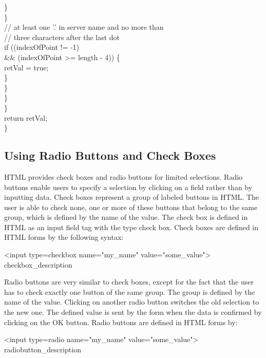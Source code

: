 \begin{java}
\jtabf                                        \}\\
\jtabe                                \}\\
\jtabf 					// at least one '.' in server name and no more than\\
\jtabf 					// three characters after the last dot\\
\jtabe                                if ((indexOfPoint != -1)\\
\jtabe				      \&\& (indexOfPoint >= length - 4)) \{\\
\jtabf                                        retVal = true;\\
\jtabe                                \}\\
\jtabd                        \}\\
\jtabc                \}\\
\jtabb        \}\\
return retVal;\\
\}\\
\end{java}

\subsection{Using Radio Buttons and Check Boxes}
HTML provides check boxes and radio buttons for limited selections.
Radio buttons enable users to specify a selection by clicking on a field
rather than by inputting data. Check boxes represent a group of labeled
buttons in HTML. The user is able to check none, one or more of these
buttons that belong to the same group, which is defined by the name of
the value. The check box is defined in HTML as an input field tag with
the type check box. Check boxes are defined in HTML forms by the
following syntax:

\begin{java}
<input  type=checkbox name="my\_name" value="some\_value">
checkbox\_description
\end{java}

Radio buttons are very similar to check boxes, except for the fact that
the user has to check exactly one button of the same group. The group is
defined by the name of the value. Clicking on another radio button
switches the old selection to the new one. The defined value is sent by
the form when the data is confirmed by clicking on the OK button. Radio
buttons are defined in HTML forms by:

\begin{java}
<input type=radio name="my\_name" value="some\_value">\\
radiobutton\_description\\
\end{java}

